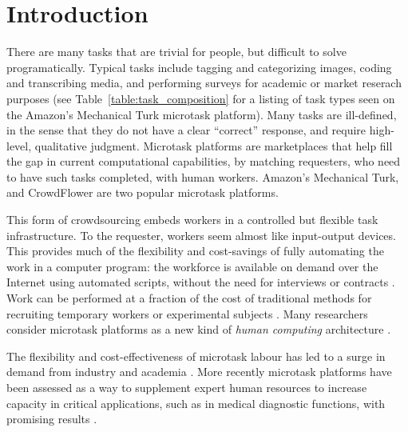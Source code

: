 \documentclass{sigchi}
\begin{document}

 

\section{Introduction}
There are many tasks that are trivial for people, but difficult to solve
programatically.  
Typical tasks include tagging and categorizing images,
coding and transcribing media,
and performing surveys for 
academic or market reserach purposes (see Table~\ref{table:task_composition} for a listing of task types seen on the Amazon's Mechanical Turk 
microtask platform).
Many tasks are ill-defined, in the sense that they do not have
a clear ``correct'' response, and require high-level, qualitative judgment.
Microtask platforms are marketplaces that help fill the gap in current 
computational capabilities, by matching requesters, who need to have such 
tasks completed, with human workers.  Amazon's Mechanical Turk, and 
CrowdFlower are two popular microtask platforms.  

This form of crowdsourcing embeds workers in a controlled but flexible
task infrastructure.  
To the requester, workers seem almost like input-output devices.  
This provides much of the flexibility and 
cost-savings of fully automating the work in a computer program: 
the workforce is available on demand over the Internet using automated 
scripts, without the need for interviews or contracts 
\cite{wolfson2011look,5543192}.
Work can be performed at a fraction of the cost of traditional methods for 
recruiting temporary workers or experimental subjects
\cite{Berinsky2012351}. %
Many researchers consider microtask platforms 
as a new kind of \textit{human computing} architecture
\cite{5543192}. %

The flexibility and cost-effectiveness of microtask labour
has led to a surge in demand from industry and 
academia \cite{wolfson2011look,Berinsky2012351}.  More recently microtask 
platforms have
been assessed as a way to supplement expert human resources to increase
capacity in critical applications, such as in medical diagnostic functions,
with promising results \cite{Warby2014385}.
\end{document}

